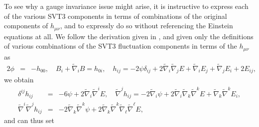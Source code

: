 \documentclass[aps,onecolumn,10pt]{revtex4}
\numberwithin{equation}{section}
\numberwithin{equation}{section}
\begin{document}
To see why a gauge invariance issue might arise, it is instructive to express each of the various SVT3 components in terms  of combinations of the original components of $h_{\mu\nu}$, and to expressly do so without referencing the Einstein equations at all. We follow the derivation given in \cite{Amarasinghe2018}, and given only the definitions of various combinations of the SVT3 fluctuation components  in terms of the $h_{\mu\nu}$ as
%
\begin{eqnarray}
2\phi&=&-h_{00},\quad B_i+\tilde{\nabla}_iB=h_{0i},\quad h_{ij}=-2\psi\delta_{ij} +2\tilde{\nabla}_i\tilde{\nabla}_j E + \tilde{\nabla}_i E_j + \tilde{\nabla}_j E_i + 2E_{ij},
\label{2.4}
\end{eqnarray}
%
we obtain
%
\begin{eqnarray}
\delta^{ij}h_{ij}&=&-6\psi+2\tilde{\nabla}_i\tilde{\nabla}^iE,\quad
 \tilde{\nabla}^jh_{ij}=-2\tilde{\nabla}_i\psi+2\tilde{\nabla}_i\tilde{\nabla}_k\tilde{\nabla}^kE+\tilde{\nabla}_k\tilde{\nabla}^kE_{i},
 \nonumber\\
\tilde{\nabla}^i \tilde{\nabla}^jh_{ij}&=&-2\tilde{\nabla}_k\tilde{\nabla}^k\psi+2\tilde{\nabla}_k\tilde{\nabla}^k\tilde{\nabla}_{\ell}\tilde{\nabla}^{\ell}E,
\label{2.5}
\end{eqnarray}
%
and can thus set 
%
\end{document}
